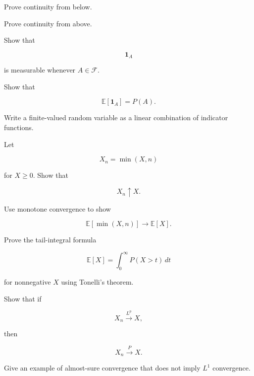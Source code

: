 \begin{exercise}[2]
Prove continuity from below.
\end{exercise}

\begin{exercise}[2]
Prove continuity from above.
\end{exercise}

\begin{exercise}[2]
Show that

\[
\mathbf{1}_A
\]

is measurable whenever \(A\in\mathcal{F}\).
\end{exercise}

\begin{exercise}[2]
Show that

\[
\mathbb{E}[\mathbf{1}_A]
=
P(A).
\]
\end{exercise}

\begin{exercise}[2]
Write a finite-valued random variable as a linear combination of
indicator functions.
\end{exercise}

\begin{exercise}[2]
Let

\[
X_n=\min(X,n)
\]

for \(X\geq0\). Show that

\[
X_n\uparrow X.
\]
\end{exercise}

\begin{exercise}[2]
Use monotone convergence to show

\[
\mathbb{E}[\min(X,n)]
\to
\mathbb{E}[X].
\]
\end{exercise}

\begin{exercise}[3]
Prove the tail-integral formula

\[
\mathbb{E}[X]
=
\int_0^\infty
P(X>t)\,dt
\]

for nonnegative \(X\) using Tonelli's theorem.
\end{exercise}

\begin{exercise}[3]
Show that if

\[
X_n\xrightarrow{L^p}X,
\]

then

\[
X_n\xrightarrow{P}X.
\]
\end{exercise}

\begin{exercise}[3]
Give an example of almost-sure convergence that does not imply
\(L^1\) convergence.
\end{exercise}

